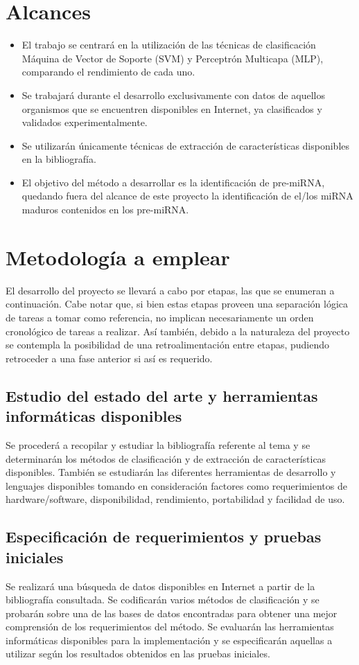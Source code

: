 \documentclass[12pt,bibliography=oldstyle,DIV=12,parskip=half-]{scrreprt}
\begin{document}
\section{Alcances}
\begin{itemize}
\item El trabajo se centrará en la utilización de las técnicas de
  clasificación Máquina de Vector de Soporte (SVM) y Perceptrón
  Multicapa (MLP), comparando el rendimiento de cada uno.
\item Se trabajará durante el desarrollo exclusivamente con datos de
  aquellos organismos que se encuentren disponibles en Internet, ya
  clasificados y validados experimentalmente.
\item Se utilizarán únicamente técnicas de extracción de
  características disponibles en la bibliografía.
\item El objetivo del método a desarrollar es la identificación de
  pre-miRNA, quedando fuera del alcance de este proyecto la
  identificación de el/los miRNA maduros contenidos en los pre-miRNA.
\end{itemize}
%
%
\section{Metodología a emplear}
El desarrollo del proyecto se llevará a cabo por etapas, las que se
enumeran a continuación.  Cabe notar que, si bien estas etapas proveen
una separación lógica de tareas a tomar como referencia, no implican
necesariamente un orden cronológico de tareas a realizar. Así también,
debido a la naturaleza del proyecto se contempla la posibilidad de una
retroalimentación entre etapas, pudiendo retroceder a una fase
anterior si así es requerido.
%
\subsection{Estudio del estado del arte y herramientas informáticas
  disponibles}
Se procederá a recopilar y estudiar la bibliografía referente al tema
y se determinarán los métodos de clasificación y de extracción de
características disponibles. También se estudiarán las diferentes
herramientas de desarrollo y lenguajes disponibles tomando en
consideración factores como requerimientos de hardware/software,
disponibilidad, rendimiento, portabilidad y facilidad de uso.
%
\subsection{Especificación de requerimientos y pruebas iniciales}
Se realizará una búsqueda de datos disponibles en Internet a partir de
la bibliografía consultada.  Se codificarán varios métodos de
clasificación y se probarán sobre una de las bases de datos
encontradas para obtener una mejor comprensión de los requerimientos
del método.
%
Se evaluarán las herramientas informáticas disponibles para la
implementación y se especificarán aquellas a utilizar según los
resultados obtenidos en las pruebas iniciales.
%
\end{document}
